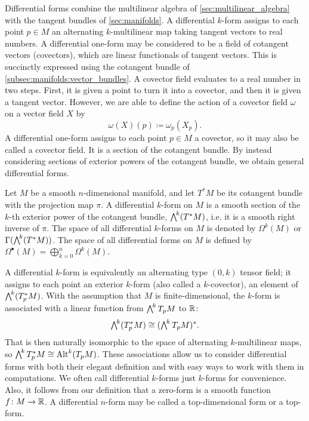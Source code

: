\documentclass[a4paper,12pt]{article}
\begin{document}
Differential forms combine the multilinear algebra of \cref{sec:multilinear_algebra} with the tangent bundles of \cref{sec:manifolds}.
A differential $k$-form assigns to each point $p \in M$ an alternating $k$-multilinear map taking tangent vectors to real numbers.
A differential one-form may be considered to be a field of cotangent vectors (covectors), which are linear functionals of tangent vectors.
This is succinctly expressed using the cotangent bundle of \cref{subsec:manifolds:vector_bundles}.
A covector field evaluates to a real number in two steps.
First, it is given a point to turn it into a covector, and then it is given a tangent vector.
However, we are able to define the action of a covector field $\omega$ on a vector field $X$ by
\begin{equation}
    \omega(X)(p) \coloneq \omega_p(X_p).
\end{equation}
A differential one-form assigns to each point $p \in M$ a covector, so it may also be called a covector field.
It is a section of the cotangent bundle.
By instead considering sections of exterior powers of the cotangent bundle, we obtain general differential forms.
\begin{definition}
    Let $M$ be a smooth $n$-dimensional manifold, and let $T^*M$ be its cotangent bundle with the projection map $\pi$.
    A differential $k$-form on $M$ is a smooth section of the $k$-th exterior power of the cotangent bundle, $\extp^k(T^*M)$, i.e. it is a smooth right inverse of $\pi$.
    The space of all differential $k$-forms on $M$ is denoted by $\Omega^k(M)$ or $\Gamma(\extp^k(T^*M))$.
    The space of all differential forms on $M$ is defined by $\Omega^\bullet(M) = \bigoplus_{k=0}^n \Omega^k(M)$.
\end{definition}
\begin{remark}
    A differential $k$-form is equivalently an alternating type $(0, k)$ tensor field; it assigns to each point an exterior $k$-form (also called a $k$-covector), an element of $\extp^k(T^*_p M)$.
    With the assumption that $M$ is finite-dimensional, the $k$-form is associated with a linear function from $\extp^k T_p M$ to $\mathbb{R}$:
    \begin{equation}
        \extp^k (T^*_p M) \cong (\extp^k T_p M)^*.
    \end{equation}
    That is then naturally isomorphic to the space of alternating $k$-multilinear maps, so $\extp^k T^*_p M \cong \Alt^k(T_p M)$.
    These associations allow us to consider differential forms with both their elegant definition and with easy ways to work with them in computations.
    We often call differential $k$-forms just $k$-forms for convenience.
    Also, it follows from our definition that a zero-form is a smooth function $f \colon M \to \mathbb{R}$.
    A differential $n$-form may be called a top-dimensional form or a top-form.
\end{remark}
\end{document}
